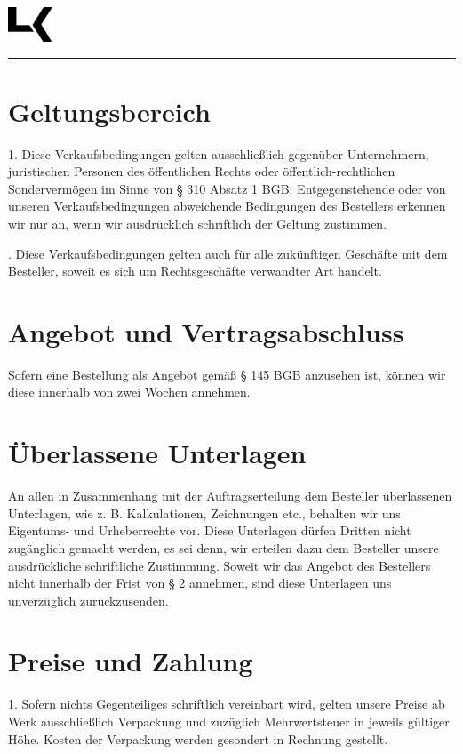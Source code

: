 \documentclass[a4paper, final, 12pt, oneside]{scrartcl}
\numberwithin{equation}{section}
\numberwithin{table}{section}
\numberwithin{figure}{section}
\begin{document}
\thispagestyle{empty}
\includegraphics[width=0.1\textwidth]{../general/logo_black.pdf}
\hfill {\LARGE \textbf{\textsf{\docTitle}}}\\
\noindent\rule{\textwidth}{0.4pt}

\begin{multicols}{2}
\section{Geltungsbereich}
1. Diese Verkaufsbedingungen gelten ausschließlich gegenüber Unternehmern,
juristischen Personen des öffentlichen Rechts oder öffentlich-rechtlichen
Sondervermögen im Sinne von § 310 Absatz 1 BGB. Entgegenstehende oder von
unseren Verkaufsbedingungen abweichende Bedingungen des Bestellers erkennen
wir nur an, wenn wir ausdrücklich schriftlich der Geltung zustimmen.
  
. Diese Verkaufsbedingungen gelten auch für alle zukünftigen Geschäfte
mit dem Besteller, soweit es sich um Rechtsgeschäfte verwandter Art handelt.

\section{Angebot und Vertragsabschluss}
Sofern eine Bestellung als Angebot gemäß § 145 BGB anzusehen ist,
können wir diese innerhalb von zwei Wochen annehmen.

\section{Überlassene Unterlagen}
An allen in Zusammenhang mit der Auftragserteilung dem Besteller überlassenen
Unterlagen, wie z. B. Kalkulationen, Zeichnungen etc., behalten wir uns
Eigentums- und Urheberrechte vor. Diese Unterlagen dürfen Dritten nicht
zugänglich gemacht werden, es sei denn, wir erteilen dazu dem Besteller
unsere ausdrückliche schriftliche Zustimmung. Soweit wir das Angebot des
Bestellers nicht innerhalb der Frist von § 2 annehmen, sind diese Unterlagen
uns unverzüglich zurückzusenden.

\section{Preise und Zahlung}
1. Sofern nichts Gegenteiliges schriftlich vereinbart wird, gelten unsere
Preise ab Werk ausschließlich Verpackung und zuzüglich Mehrwertsteuer in
jeweils gültiger Höhe. Kosten der Verpackung werden gesondert in Rechnung
gestellt.


\end{multicols}
\end{document}
